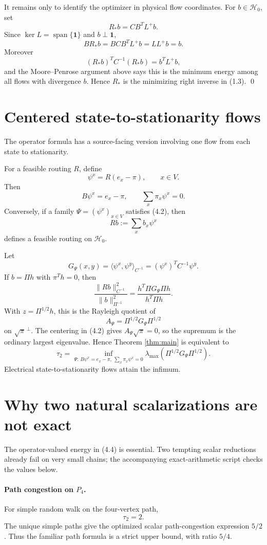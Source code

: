 \documentclass[11pt]{article}
\newcommand{\cH}{\mathcal H}
\newcommand{\ip}[2]{\langle #1,#2\rangle}
\newcommand{\one}{\mathbf 1}
\begin{document}
It remains only to identify the optimizer in physical flow coordinates. For $b\in\cH_0$, set
\[
R_*b=CB^TL^+b.
\]
Since $\ker L=\operatorname{span}\{\one\}$ and $b\perp\one$,
\[
BR_*b=BCB^TL^+b=LL^+b=b.
\]
Moreover
\[
(R_*b)^TC^{-1}(R_*b)=b^TL^+b,
\]
and the Moore--Penrose argument above says this is the minimum energy among all flows with divergence $b$. Hence $R_*$ is the minimizing right inverse in (1.3).
\qed

\section{Centered state-to-stationarity flows}
The operator formula has a source-facing version involving one flow from each state to stationarity.

For a feasible routing $R$, define
\[
\psi^x=R(e_x-\pi),
\qquad x\in V.
\tag{4.1}
\]
Then
\[
B\psi^x=e_x-\pi,
\qquad
\sum_x\pi_x\psi^x=0.
\tag{4.2}
\]
Conversely, if a family $\Psi=(\psi^x)_{x\in V}$ satisfies (4.2), then
\[
Rb:=\sum_x b_x\psi^x
\]
defines a feasible routing on $\cH_0$.

Let
\[
G_\Psi(x,y)=\ip{\psi^x}{\psi^y}_{C^{-1}}
=(\psi^x)^TC^{-1}\psi^y.
\tag{4.3}
\]
If $b=\Pi h$ with $\pi^Th=0$, then
\[
\frac{\|Rb\|_{C^{-1}}^2}{\|b\|_{\Pi^{-1}}^2}
=
\frac{h^T\Pi G_\Psi\Pi h}{h^T\Pi h}.
\]
With $z=\Pi^{1/2}h$, this is the Rayleigh quotient of
\[
A_\Psi=\Pi^{1/2}G_\Psi\Pi^{1/2}
\]
on $\sqrt\pi^{\,\perp}$. The centering in (4.2) gives $A_\Psi\sqrt\pi=0$, so the supremum is the ordinary largest eigenvalue. Hence Theorem \ref{thm:main} is equivalent to
\[
\boxed{
\tau_2=
\inf_{\Psi:\,B\psi^x=e_x-\pi,\ \sum_x\pi_x\psi^x=0}
\lambda_{\max}\!\left(\Pi^{1/2}G_\Psi\Pi^{1/2}\right).
}
\tag{4.4}
\]
Electrical state-to-stationarity flows attain the infimum.

\section{Why two natural scalarizations are not exact}
The operator-valued energy in (4.4) is essential. Two tempting scalar reductions already fail on very small chains; the accompanying exact-arithmetic script checks the values below.

\paragraph{Path congestion on $P_4$.}
For simple random walk on the four-vertex path,
\[
\tau_2=2.
\]
The unique simple paths give the optimized scalar path-congestion expression $5/2$. Thus the familiar path formula is a strict upper bound, with ratio $5/4$.
\end{document}
